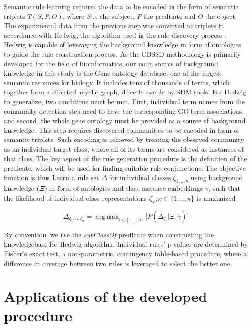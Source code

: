 \documentclass[oribibl,runningheads,a4paper]{llncs}
\DeclareMathOperator*{\argmax}{arg\,max}
\begin{document}
Semantic rule learning requires the data to be encoded in the form of semantic triplets $T(S,P,O)$, where $S$ is the subject, $P$ the predicate and $O$ the object. The experimental data from the previous step was converted to triplets in accordance with Hedwig, the algorithm used in the rule discovery process \cite{vavpetivc2013semantic}. Hedwig is capable of leveraging the background knowledge in form of ontologies to guide the rule construction process. As the CBSSD methodology is primarily developed for the field of bioinformatics, our main source of background knowledge in this study is the Gene ontology \cite{ashburner2000gene} database, one of the largest semantic resources for biology. It includes tens of thousands of terms, which together form a directed acyclic graph, directly usable by SDM tools. For Hedwig to generalize, two conditions must be met. First, individual term names from the community detection step need to have the corresponding GO term associations, and second, the whole gene ontology must be provided as a source of background knowledge. This step requires discovered communities to be encoded in form of semantic triplets. Such encoding is achieved by treating the observed community as an individual target class, where all of its terms are considered as instances of that class. The key aspect of the rule generation procedure is the definition of the predicate, which will be used for finding suitable rule conjunctions. The objective function is thus  Learn a rule set $\Delta$  for individual classes $\zeta_{1,..,n}$ using background knowledge ($\Xi$) in form of ontologies and class instance embeddings $\gamma$, such that the likelihood of individual class representations $\zeta_{x};x \in \{1,..,n\}$ is maximized.

\begin{equation}
\Delta_{\zeta_{1},..,\zeta_{n}} = \argmax_{i \in \{1,..,n\}}\Big[P(\Delta_{\zeta_{i}}|\Xi,\gamma) \Big]
\end{equation}

By convention, we use the \emph{subClassOf} predicate when constructing the knowledgebase for Hedwig algorithm. Individual rules' p-values are determined by Fisher's exact test, a non-parametric, contingency table-based procedure, where a difference in coverage between two rules is leveraged to select the better one.

\section{Applications of the developed procedure}
\end{document}
